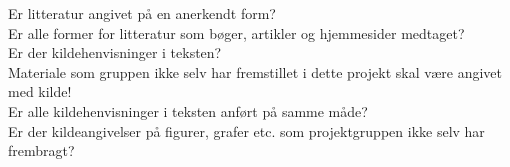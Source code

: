 Er litteratur angivet på en anerkendt form? \\
Er alle former for litteratur som bøger, artikler og hjemmesider medtaget? \\
Er der kildehenvisninger i teksten? \\
Materiale som gruppen ikke selv har fremstillet i dette projekt skal være angivet med kilde! \\
Er alle kildehenvisninger i teksten anført på samme måde? \\
Er der kildeangivelser på figurer, grafer etc. som projektgruppen ikke selv har frembragt? \\